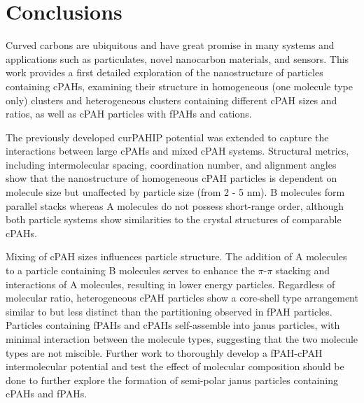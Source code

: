 %

\section{Conclusions}
Curved carbons are ubiquitous and have great promise in many systems and applications such as particulates, novel nanocarbon materials, and sensors. This work provides a first detailed exploration of the nanostructure of particles containing cPAHs, examining their structure in homogeneous (one molecule type only) clusters and heterogeneous clusters containing different cPAH sizes and ratios, as well as cPAH particles with fPAHs and cations.

The previously developed curPAHIP potential was extended to capture the interactions between large cPAHs and mixed cPAH systems. Structural metrics, including intermolecular spacing, coordination number, and alignment angles show that the nanostructure of homogeneous cPAH particles is dependent on molecule size but unaffected by particle size (from 2 - 5 nm). B molecules form parallel stacks whereas A molecules do not possess short-range order, although both particle systems show similarities to the crystal structures of comparable cPAHs.

Mixing of cPAH sizes influences particle structure. The addition of A molecules to a particle containing B molecules serves to enhance the $\pi$-$\pi$ stacking and interactions of A molecules, resulting in lower energy particles. Regardless of molecular ratio, heterogeneous cPAH particles show a core-shell type arrangement similar to but less distinct than the partitioning observed in fPAH particles. Particles containing fPAHs and cPAHs self-assemble into janus particles, with minimal interaction between the molecule types, suggesting that the two molecule types are not miscible. Further work to thoroughly develop a fPAH-cPAH intermolecular potential and test the effect of molecular composition should be done to further explore the formation of semi-polar janus particles containing cPAHs and fPAHs. 

